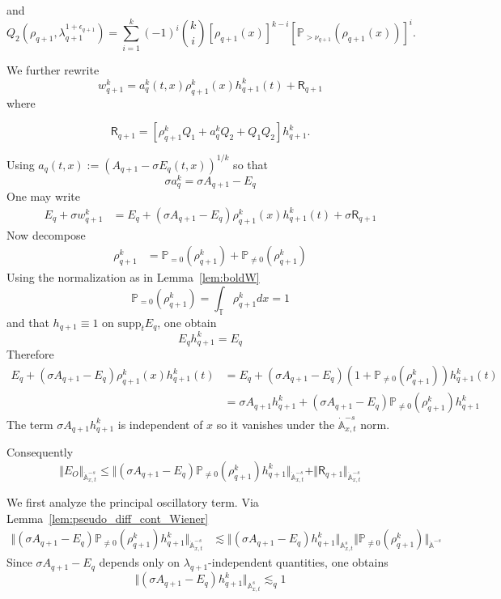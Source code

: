 \documentclass[12pt,reqno,letterpaper]{amsart}
\numberwithin{equation}{section}
\newcommand{\1}{{\bf 1}}
\newcommand{\2}{{\bf 2}}
\newcommand{\A}{\mathbb A}
\newcommand{\T}{\mathbb T}
\renewcommand{\P}{\mathbb{P}}
\newcommand{\norm}[1]{ \Vert #1 \Vert}
\theoremstyle{remark}
\theoremstyle{remark}
\begin{document}
and 
\begin{equation*}
    Q_2(\rho_{q+1},\lambda_{q+1}^{1+\epsilon_{q+1}})=\sum_{i=1}^k(-1)^i \binom{k}{i}  [\rho_{q+1}(x)]^{k-i} \left[ \mathbb{P}_{>\nu_{q+1}} (\rho_{q+1}(x))  \right]^i .
\end{equation*}

We further rewrite 
\begin{equation*}
        w_{q+1}^k= a^k_q(t,x)\rho_{q+1}^k(x)h_{q+1}^k(t)+ \mathsf{R}_{q+1}
\end{equation*}
where 

\begin{equation*}
   \mathsf{R}_{q+1}= [\rho_{q+1}^k Q_1+a_q^kQ_2+Q_1Q_2 ]h_{q+1}^k.
\end{equation*}

Using $a_q(t,x):=(A_{q+1}-\sigma E_q(t,x))^{1/k}$ so that 
\[\sigma a_q^k = \sigma A_{q+1} - E_q\]
One may write 
\begin{align*}
    E_q + \sigma w_{q+1}^k &= E_q + (\sigma A_{q+1} - E_q)\rho_{q+1}^k(x) h_{q+1}^k(t) + \sigma \mathsf{R}_{q+1}
\end{align*}
Now decompose 
\begin{align*}
    \rho_{q+1}^k &= \P_{ = 0}(\rho_{q+1}^k) + \P_{\neq 0}(\rho_{q+1}^k) 
\end{align*}
Using the normalization as in Lemma~\ref{lem:boldW}
\[\P_{ = 0}(\rho_{q+1}^k) = \int_\T \rho_{q+1}^k dx = 1\]
and that $h_{q+1} \equiv 1$ on $\mathrm{supp}_t E_q$, one obtain 
\[E_q h_{q+1}^k = E_q\]
Therefore 
\begin{align*}
    E_q + (\sigma A_{q+1} - E_q)\rho_{q+1}^k(x) h_{q+1}^k(t) &= E_q + (\sigma A_{q+1} - E_q)(1 + \P_{\neq 0}(\rho_{q+1}^k)) h_{q+1}^k(t)\\
    &= \sigma A_{q+1} h_{q+1}^k + (\sigma A_{q+1} - E_q) \P_{\neq 0}(\rho_{q+1}^k) h_{q+1}^k
\end{align*}
The term $\sigma A_{q+1} h_{q+1}^k $ is independent of $x$ so it vanishes under the ${\dot{\mathbb{A}}_{x,t}^{-s}}$ norm. 



Consequently 
\[\norm{E_O}_{\dot{\mathbb{A}}_{x,t}^{-s}} \leq \norm{(\sigma A_{q+1} - E_q) \P_{\neq 0}(\rho_{q+1}^k) h_{q+1}^k}_{\dot{\mathbb{A}}_{x,t}^{-s}} + \norm{\mathsf{R}_{q+1}}_{\dot{\mathbb{A}}_{x,t}^{-s}}\]





We first analyze the principal oscillatory term. Via Lemma~\ref{lem:pseudo_diff_cont_Wiener}
\begin{align*}
     \norm{(\sigma A_{q+1} - E_q) \P_{\neq 0}(\rho_{q+1}^k) h_{q+1}^k}_{\dot{\mathbb{A}}_{x,t}^{-s}} &\lesssim \norm{(\sigma A_{q+1} - E_q) h_{q+1}^k}_{\mathbb{A}_{x,t}^{s}} \norm{\P_{\neq 0}(\rho_{q+1}^k)}_{\dot{\A}^{-s}}
\end{align*}
Since $\sigma A_{q+1} - E_q$ depends only on $\lambda_{q+1}$-independent quantities, one obtains
\[ \norm{(\sigma A_{q+1} - E_q) h_{q+1}^k}_{\mathbb{A}_{x,t}^{s}}  \lesssim_q 1\]
\end{document}
